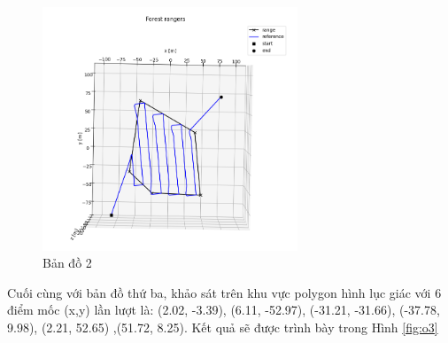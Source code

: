 
\begin{figure}[h!]
    \centering
    \includegraphics[width=0.68\textwidth]{chapter5/image/anh2_op.png}
    \caption{Bản đồ 2}
    \label{fig:o2}
\end{figure}


Cuối cùng với bản đồ thứ ba, khảo sát trên khu vực polygon hình lục giác với 6 điểm mốc (x,y) lần lượt là: (2.02, -3.39), (6.11, -52.97), (-31.21, -31.66), (-37.78, 9.98), (2.21, 52.65) ,(51.72, 8.25). Kết quả sẽ được trình bày trong Hình \ref{fig:o3}

